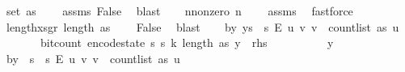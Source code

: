 \begin{isabellebody}
\ {\isachardoublequoteopen}set\ as\ {\isasymnoteq}\ {\isacharbraceleft}{\kern0pt}{\isacharbraceright}{\kern0pt}{\isachardoublequoteclose}\ \isamarkupfalse%
\ assms\ False\ \isamarkupfalse%
\ blast\isanewline
\ \ \isamarkupfalse%
\ n{\isacharunderscore}{\kern0pt}nonzero{\isacharcolon}{\kern0pt}\ {\isachardoublequoteopen}n\ {\isachargreater}{\kern0pt}\ {}{\isachardoublequoteclose}\ \isamarkupfalse%
\ assms{\isacharparenleft}{\kern0pt}{}{\isacharparenright}{\kern0pt}\ \isamarkupfalse%
\ fastforce\isanewline
\ \ \isamarkupfalse%
\ length{\isacharunderscore}{\kern0pt}xs{\isacharunderscore}{\kern0pt}gr{\isacharunderscore}{\kern0pt}{}{\isacharcolon}{\kern0pt}\ {\isachardoublequoteopen}length\ as\ {\isachargreater}{\kern0pt}\ {}{\isachardoublequoteclose}\ \isamarkupfalse%
\ False\ \isamarkupfalse%
\ blast\isanewline
\isanewline
\ \ \isamarkupfalse%
\ b{\isacharcolon}{\kern0pt}{\isachardoublequoteopen}{\isasymAnd}y{\isachardot}{\kern0pt}\ y{\isasymin}{\isacharbraceleft}{\kern0pt}{}{\isachardot}{\kern0pt}{\isachardot}{\kern0pt}{\isacharless}{\kern0pt}s\ {\isasymtimes}\ {\isacharbraceleft}{\kern0pt}{}{\isachardot}{\kern0pt}{\isachardot}{\kern0pt}{\isacharless}{\kern0pt}s\ {\isasymrightarrow}\isactrlsub E\ {\isacharbraceleft}{\kern0pt}{\isacharparenleft}{\kern0pt}u{\isacharcomma}{\kern0pt}\ v{\isacharparenright}{\kern0pt}{\isachardot}{\kern0pt}\ v\ {\isacharless}{\kern0pt}\ count{\isacharunderscore}{\kern0pt}list\ as\ u{\isacharbraceright}{\kern0pt}\ {\isasymLongrightarrow}\isanewline
\ \ \ \ \ \ \ bit{\isacharunderscore}{\kern0pt}count\ {\isacharparenleft}{\kern0pt}encode{\isacharunderscore}{\kern0pt}state\ {\isacharparenleft}{\kern0pt}s\ s\ k{\isacharcomma}{\kern0pt}\ length\ as{\isacharcomma}{\kern0pt}\ y{\isacharparenright}{\kern0pt}{\isacharparenright}{\kern0pt}\ {\isasymle}\ {\isacharquery}{\kern0pt}rhs{\isachardoublequoteclose}\isanewline
\ \ \isamarkupfalse%
\ {\isacharminus}{\kern0pt}\isanewline
\ \ \ \ \isamarkupfalse%
\ y\isanewline
\ \ \ \ \isamarkupfalse%
\ b{}{\isacharcolon}{\kern0pt}{\isachardoublequoteopen}y\ {\isasymin}\ {\isacharbraceleft}{\kern0pt}{}{\isachardot}{\kern0pt}{\isachardot}{\kern0pt}{\isacharless}{\kern0pt}s\ {\isasymtimes}\ {\isacharbraceleft}{\kern0pt}{}{\isachardot}{\kern0pt}{\isachardot}{\kern0pt}{\isacharless}{\kern0pt}s\ {\isasymrightarrow}\isactrlsub E\ {\isacharbraceleft}{\kern0pt}{\isacharparenleft}{\kern0pt}u{\isacharcomma}{\kern0pt}\ v{\isacharparenright}{\kern0pt}{\isachardot}{\kern0pt}\ v\ {\isacharless}{\kern0pt}\ count{\isacharunderscore}{\kern0pt}list\ as\ u{\isacharbraceright}{\kern0pt}{\isachardoublequoteclose}\isanewline

\end{isabellebody}
